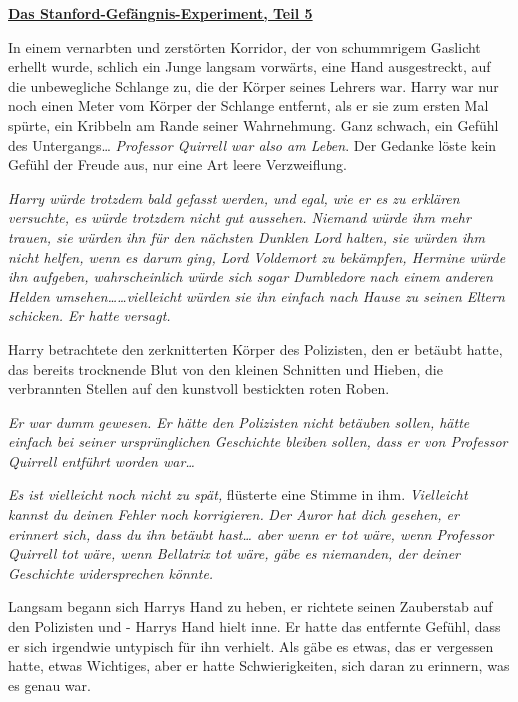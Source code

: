 

\hypertarget{das-stanford-gefuxe4ngnis-experiment-teil-5}{%

\textbf{\uline{Das Stanford-Gefängnis-Experiment, Teil 5}}

In einem vernarbten und zerstörten Korridor, der von schummrigem Gaslicht erhellt wurde, schlich ein Junge langsam vorwärts, eine Hand ausgestreckt, auf die unbewegliche Schlange zu, die der Körper seines Lehrers war. Harry war nur noch einen Meter vom Körper der Schlange entfernt, als er sie zum ersten Mal spürte, ein Kribbeln am Rande seiner Wahrnehmung. Ganz schwach, ein Gefühl des Untergangs… \emph{Professor Quirrell war also am Leben}. Der Gedanke löste kein Gefühl der Freude aus, nur eine Art leere Verzweiflung.

\emph{Harry würde trotzdem bald gefasst werden, und egal, wie er es zu erklären versuchte, es würde trotzdem nicht gut aussehen. Niemand würde ihm mehr trauen, sie würden ihn für den nächsten Dunklen Lord halten, sie würden ihm nicht helfen, wenn es darum ging, Lord Voldemort zu bekämpfen, Hermine würde ihn aufgeben, wahrscheinlich würde sich sogar Dumbledore nach einem anderen Helden umsehen……vielleicht würden sie ihn einfach nach Hause zu seinen Eltern schicken. Er hatte versagt.}

Harry betrachtete den zerknitterten Körper des Polizisten, den er betäubt hatte, das bereits trocknende Blut von den kleinen Schnitten und Hieben, die verbrannten Stellen auf den kunstvoll bestickten roten Roben.

\emph{Er war dumm gewesen. Er hätte den Polizisten nicht betäuben sollen, hätte einfach bei seiner ursprünglichen Geschichte bleiben sollen, dass er von Professor Quirrell entführt worden war…}

\emph{Es ist vielleicht noch nicht zu spät,} flüsterte eine Stimme in ihm. \emph{Vielleicht kannst du deinen Fehler noch korrigieren.} \emph{Der Auror hat dich gesehen, er erinnert sich, dass du ihn betäubt hast… aber wenn er tot wäre, wenn Professor Quirrell tot wäre, wenn Bellatrix tot wäre, gäbe es niemanden, der deiner Geschichte widersprechen könnte.}

Langsam begann sich Harrys Hand zu heben, er richtete seinen Zauberstab auf den Polizisten und - Harrys Hand hielt inne. Er hatte das entfernte Gefühl, dass er sich irgendwie untypisch für ihn verhielt. Als gäbe es etwas, das er vergessen hatte, etwas Wichtiges, aber er hatte Schwierigkeiten, sich daran zu erinnern, was es genau war.

}
